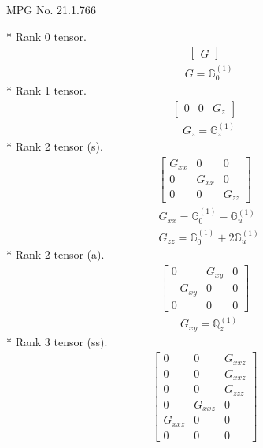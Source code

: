 \documentclass[fleqn,8pt,landscape]{jsarticle}
\begin{document}
\setcounter{MaxMatrixCols}{32}

\renewcommand{\tablename}{Table~}
\renewcommand{\figurename}{Figure~}
\begin{center}
\LARGE
MPG No. 21.1.76\quad$6$
\end{center}
* Rank 0 tensor.
\begin{align*}
\begin{bmatrix} G \end{bmatrix}
\end{align*}
\begin{align*}
& G = \mathbb{G}_{0}^{(1)}
\end{align*}
* Rank 1 tensor.
\begin{align*}
\begin{bmatrix} 0 & 0 & G_{z} \end{bmatrix}
\end{align*}
\begin{align*}
& G_{z} = \mathbb{G}_{z}^{(1)}
\end{align*}
* Rank 2 tensor (s).
\begin{align*}
\begin{bmatrix} G_{xx} & 0 & 0 \\ 0 & G_{xx} & 0 \\ 0 & 0 & G_{zz} \end{bmatrix}
\end{align*}
\begin{align*}
& G_{xx} = \mathbb{G}_{0}^{(1)} - \mathbb{G}_{u}^{(1)} \\
& G_{zz} = \mathbb{G}_{0}^{(1)} + 2 \mathbb{G}_{u}^{(1)}
\end{align*}
* Rank 2 tensor (a).
\begin{align*}
\begin{bmatrix} 0 & G_{xy} & 0 \\ - G_{xy} & 0 & 0 \\ 0 & 0 & 0 \end{bmatrix}
\end{align*}
\begin{align*}
& G_{xy} = \mathbb{Q}_{z}^{(1)}
\end{align*}
* Rank 3 tensor (ss).
\begin{align*}
\begin{bmatrix} 0 & 0 & G_{xxz} \\ 0 & 0 & G_{xxz} \\ 0 & 0 & G_{zzz} \\ 0 & G_{xxz} & 0 \\ G_{xxz} & 0 & 0 \\ 0 & 0 & 0 \end{bmatrix}
\end{align*}
\end{document}
